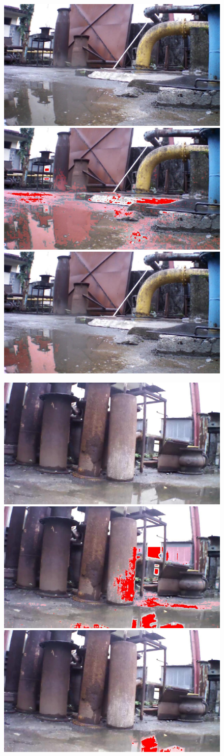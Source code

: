 \documentclass[11pt]{article}
\begin{document}
\begin{figure}
  \includegraphics[width=0.32\linewidth]{stagnantWater/results/dataset_82/IMG_PAIR_192_1} \hfill
  \includegraphics[width=0.32\linewidth]{stagnantWater/results/dataset_82/output_192_jpl2} \hfill
  \includegraphics[width=0.32\linewidth]{stagnantWater/results/dataset_82/output_192}
  
  \includegraphics[width=0.32\linewidth]{stagnantWater/results/dataset_83/IMG_PAIR_130_1} \hfill
  \includegraphics[width=0.32\linewidth]{stagnantWater/results/dataset_83/output_130_jpl2} \hfill
  \includegraphics[width=0.32\linewidth]{stagnantWater/results/dataset_83/output_130}


\end{figure}
\end{document}
